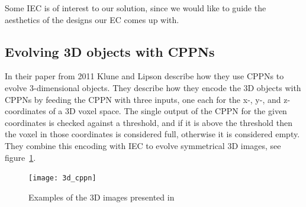 Some IEC is of interest to our solution, since we would like to guide the 
aesthetics of the designs our EC comes up with. 

\subsection{Evolving 3D objects with CPPNs}
In their paper from 2011 Klune and Lipson describe how they use CPPNs to evolve 
3-dimensional objects\cite{Clune:2011:EOG:2078245.2078246}.
They describe how they encode the 3D objects with CPPNs by feeding the CPPN 
with three inputs, one each for the x-, y-, and z-coordinates of a 3D voxel 
space.
The single output of the CPPN for the given coordinates is checked against a 
threshold, and if it is above the threshold then the voxel in those coordinates 
is considered full, otherwise it is considered 
empty\cite[p.~5]{Clune:2011:EOG:2078245.2078246}.
They combine this encoding with IEC to evolve symmetrical 3D images, see 
figure~\ref{fig:3dobjects}.
\begin{figure}[ht]
\centering
\texttt{[image: 3d\_cppn]}
\caption{Examples of the 3D images presented in 
\cite{Clune:2011:EOG:2078245.2078246}}
\label{fig:3dobjects}
\end{figure}

